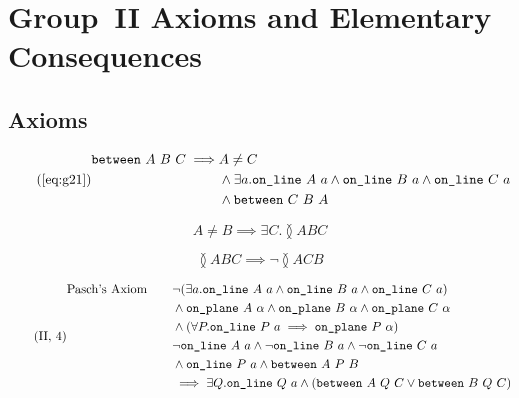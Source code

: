 \chapter{Group~II Axioms and Elementary Consequences}\label{app:Group2}

\section{Axioms}
\begin{equation}
 \tag{\ref{eq:g21}}
  \begin{split}
    \between{A}{B}{C} \implies & A \neq C\\
                               & \wedge \exists a. \code{on\_line}\ A\ a \wedge \code{on\_line}\ B\ a \wedge \code{on\_line}\ C\ a\\
                               & \wedge \between{C}{B}{A}
  \end{split}
\end{equation}

\begin{equation}\label{eq:g22}
  \tag{II,~2}
  A \neq B \implies \exists C. \between{A}{B}{C}
\end{equation}

\begin{equation}\label{eq:g23}
  \tag{II,~3}
  \between{A}{B}{C} \implies \neg\between{A}{C}{B}
\end{equation}

\begin{equation}\label{eq:g24}
  \tag{II,~4}
  \begin{split}
    \text{Pasch's Axiom}\qquad & \neg(\exists a.\texttt{on\_line}\ A\ a\wedge \texttt{on\_line}\ B\ a\wedge \texttt{on\_line}\ C\ a)\\
    & \wedge \texttt{on\_plane}\ A\ \alpha \wedge \texttt{on\_plane}\ B\ \alpha \wedge \texttt{on\_plane}\ C\ \alpha \\
    & \wedge (\forall P. \texttt{on\_line}\ P\ a \implies \texttt{on\_plane}\ P\ \alpha)\\
    & \neg\texttt{on\_line}\ A\ a \wedge \neg\texttt{on\_line}\ B\ a \wedge \neg\texttt{on\_line}\ C\ a\\
    & \wedge \texttt{on\_line}\ P\ a \wedge \texttt{between}\ A\ P\ B\\
    & \implies \exists Q. \texttt{on\_line}\ Q\ a \wedge (\texttt{between}\ A\ Q\ C \vee \texttt{between}\ B\ Q\ C)
  \end{split}
\end{equation}

